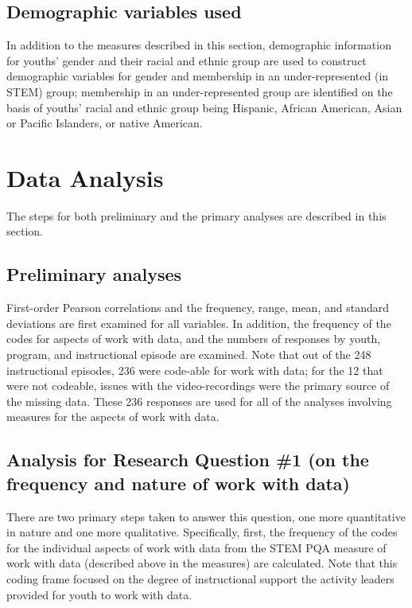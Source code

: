 \documentclass[]{book}
\theoremstyle{definition}
\theoremstyle{definition}
\theoremstyle{definition}
\theoremstyle{remark}
\begin{document}
\subsection{Demographic variables
used}\label{demographic-variables-used}

In addition to the measures described in this section, demographic
information for youths' gender and their racial and ethnic group are
used to construct demographic variables for gender and membership in an
under-represented (in STEM) group; membership in an under-represented
group are identified on the basis of youths' racial and ethnic group
being Hispanic, African American, Asian or Pacific Islanders, or native
American.

\section{Data Analysis}\label{data-analysis}

The steps for both preliminary and the primary analyses are described in
this section.

\subsection{Preliminary analyses}\label{preliminary-analyses}

First-order Pearson correlations and the frequency, range, mean, and
standard deviations are first examined for all variables. In addition,
the frequency of the codes for aspects of work with data, and the
numbers of responses by youth, program, and instructional episode are
examined. Note that out of the 248 instructional episodes, 236 were
code-able for work with data; for the 12 that were not codeable, issues
with the video-recordings were the primary source of the missing data.
These 236 responses are used for all of the analyses involving measures
for the aspects of work with data.

\subsection{Analysis for Research Question \#1 (on the frequency and
nature of work with
data)}\label{analysis-for-research-question-1-on-the-frequency-and-nature-of-work-with-data}

There are two primary steps taken to answer this question, one more
quantitative in nature and one more qualitative. Specifically, first,
the frequency of the codes for the individual aspects of work with data
from the STEM PQA measure of work with data (described above in the
measures) are calculated. Note that this coding frame focused on the
degree of instructional support the activity leaders provided for youth
to work with data.
\end{document}
